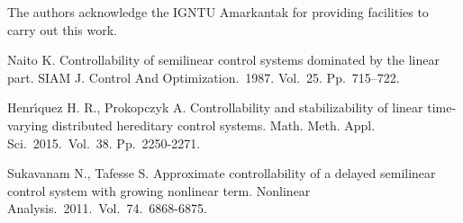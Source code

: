 \documentclass[12pt]{llncs}
\begin{document}
The authors acknowledge the IGNTU Amarkantak for providing facilities to carry out this work.

\begin{thebibliography}{9} %

  Naito K. Controllability of semilinear control systems dominated by the linear part. SIAM J. Control And Optimization.~1987. Vol.~25. Pp.~715--722.

 Henr\'{\i}quez H. R., Prokopczyk A. Controllability and stabilizability of linear time-varying distributed hereditary control systems. Math. Meth. Appl. Sci.~2015.~Vol.~38. Pp.~2250-2271.

 Sukavanam N., Tafesse S. Approximate controllability of a delayed semilinear control system with growing nonlinear term. Nonlinear Analysis.~2011.~Vol.~74.~6868-6875.

\end{thebibliography}

\end{document}
